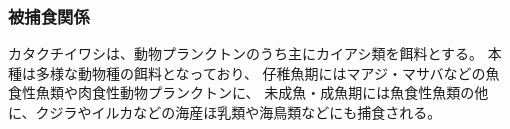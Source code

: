 \subsubsection{被捕食関係}
カタクチイワシは、動物プランクトンのうち主にカイアシ類を餌料とする\citep{Tanaka2006}。
本種は多様な動物種の餌料となっており、
仔稚魚期にはマアジ・マサバなどの魚食性魚類や肉食性動物プランクトンに、
未成魚・成魚期には魚食性魚類の他に、クジラやイルカなどの海産ほ乳類や海鳥類などにも捕食される。

